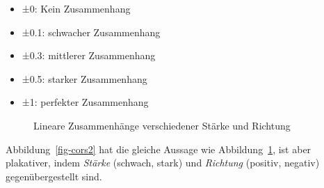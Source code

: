\documentclass[
  letterpaper,
  oneside,
  open=any]{scrbook}
\providecommand{\tightlist}{%
  \setlength{\itemsep}{0pt}\setlength{\parskip}{0pt}}\usepackage{longtable,booktabs,array}
\theoremstyle{definition}
\theoremstyle{definition}
\theoremstyle{definition}
\theoremstyle{remark}
\begin{document}
\begin{itemize}
\tightlist
\item
  ±0: Kein Zusammenhang
\item
  ±0.1: schwacher Zusammenhang
\item
  ±0.3: mittlerer Zusammenhang
\item
  ±0.5: starker Zusammenhang
\item
  ±1: perfekter Zusammenhang
\end{itemize}

\begin{figure}


\caption{\label{fig-cors}Lineare Zusammenhänge verschiedener Stärke und
Richtung}

\end{figure}%

Abbildung~\ref{fig-cors2} hat die gleiche Aussage wie
Abbildung~\ref{fig-cors}, ist aber plakativer, indem \emph{Stärke}
(schwach, stark) und \emph{Richtung} (positiv, negativ)
gegenübergestellt sind.
\end{document}

